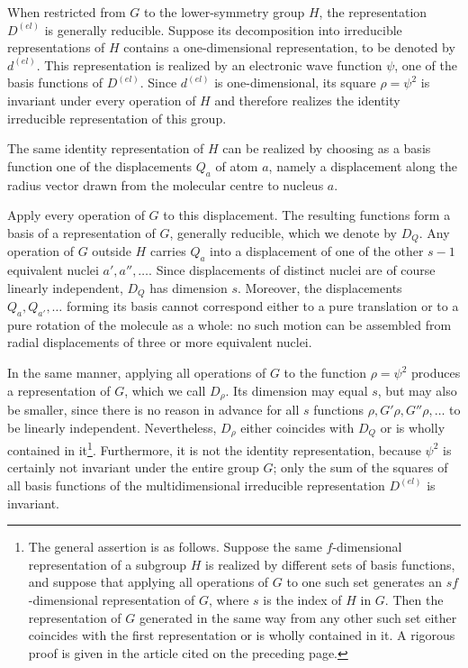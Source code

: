 When restricted from $G$ to the lower-symmetry group $H$, the representation $D^{(el)}$ is generally reducible. Suppose its decomposition into irreducible representations of $H$ contains a one-dimensional representation, to be denoted by $d^{(el)}$. This representation is realized by an electronic wave function $\psi$, one of the basis functions of $D^{(el)}$. Since $d^{(el)}$ is one-dimensional, its square $\rho=\psi^2$ is invariant under every operation of $H$ and therefore realizes the identity irreducible representation of this group.

The same identity representation of $H$ can be realized by choosing as a basis function one of the displacements $Q_a$ of atom $a$, namely a displacement along the radius vector drawn from the molecular centre to nucleus $a$.

Apply every operation of $G$ to this displacement. The resulting functions form a basis of a representation of $G$, generally reducible, which we denote by $D_Q$. Any operation of $G$ outside $H$ carries $Q_a$ into a displacement of one of the other $s-1$ equivalent nuclei $a',a'',\ldots$. Since displacements of distinct nuclei are of course linearly independent, $D_Q$ has dimension $s$. Moreover, the displacements $Q_a,Q_{a'},\ldots$ forming its basis cannot correspond either to a pure translation or to a pure rotation of the molecule as a whole: no such motion can be assembled from radial displacements of three or more equivalent nuclei.

In the same manner, applying all operations of $G$ to the function $\rho=\psi^2$ produces a representation of $G$, which we call $D_\rho$. Its dimension may equal $s$, but may also be smaller, since there is no reason in advance for all $s$ functions $\rho,G'\rho,G''\rho,\ldots$ to be linearly independent. Nevertheless, $D_\rho$ either coincides with $D_Q$ or is wholly contained in it\footnote{The general assertion is as follows. Suppose the same $f$-dimensional representation of a subgroup $H$ is realized by different sets of basis functions, and suppose that applying all operations of $G$ to one such set generates an $sf$-dimensional representation of $G$, where $s$ is the index of $H$ in $G$. Then the representation of $G$ generated in the same way from any other such set either coincides with the first representation or is wholly contained in it. A rigorous proof is given in the article cited on the preceding page.}. Furthermore, it is not the identity representation, because $\psi^2$ is certainly not invariant under the entire group $G$; only the sum of the squares of all basis functions of the multidimensional irreducible representation $D^{(el)}$ is invariant.

